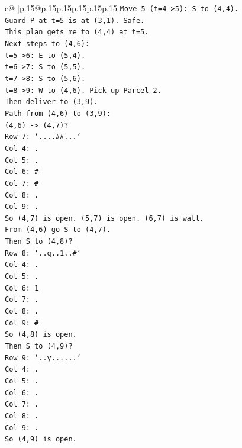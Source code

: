 \documentclass{article}
\begin{document}
{\begin{supertabular}{c@{$\;$}|p{.15\linewidth}@{}p{.15\linewidth}p{.15\linewidth}p{.15\linewidth}p{.15\linewidth}p{.15\linewidth}}
{{{\texttt{Move 5 (t=4{-}>5): S to (4,4).} \\
\texttt{Guard P at t=5 is at (3,1). Safe.} \\
\texttt{This plan gets me to (4,4) at t=5.} \\
\texttt{Next steps to (4,6):} \\
\texttt{t=5{-}>6: E to (5,4).} \\
\texttt{t=6{-}>7: S to (5,5).} \\
\texttt{t=7{-}>8: S to (5,6).} \\
\texttt{t=8{-}>9: W to (4,6). Pick up Parcel 2.} \\
\texttt{Then deliver to (3,9).} \\
\texttt{Path from (4,6) to (3,9):} \\
\texttt{(4,6) {-}> (4,7)?} \\
\texttt{Row 7: `....\#\#...`} \\
\texttt{Col 4: .} \\
\texttt{Col 5: .} \\
\texttt{Col 6: \#} \\
\texttt{Col 7: \#} \\
\texttt{Col 8: .} \\
\texttt{Col 9: .} \\
\texttt{So (4,7) is open. (5,7) is open. (6,7) is wall.} \\
\texttt{From (4,6) go S to (4,7).} \\
\texttt{Then S to (4,8)?} \\
\texttt{Row 8: `..q..1..\#`} \\
\texttt{Col 4: .} \\
\texttt{Col 5: .} \\
\texttt{Col 6: 1} \\
\texttt{Col 7: .} \\
\texttt{Col 8: .} \\
\texttt{Col 9: \#} \\
\texttt{So (4,8) is open.} \\
\texttt{Then S to (4,9)?} \\
\texttt{Row 9: `..y......`} \\
\texttt{Col 4: .} \\
\texttt{Col 5: .} \\
\texttt{Col 6: .} \\
\texttt{Col 7: .} \\
\texttt{Col 8: .} \\
\texttt{Col 9: .} \\
\texttt{So (4,9) is open.} \\
}}}
\end{supertabular}}
\end{document}
